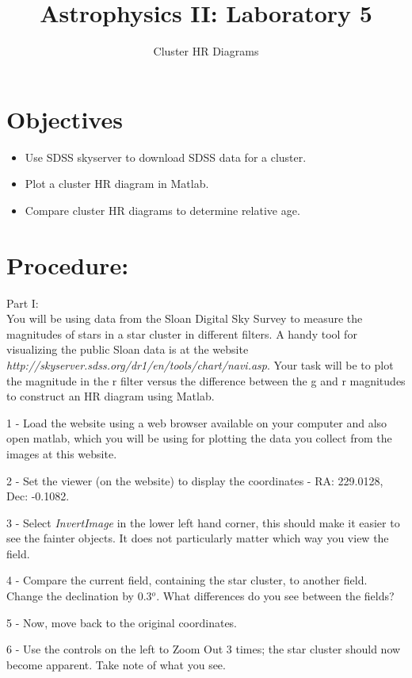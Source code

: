 \documentclass[11pt]{article}
\begin{document}
\title{Astrophysics II: Laboratory 5}
\author{\Large Cluster HR Diagrams}
\maketitle

\baselineskip 15pt

\section{\bf Objectives}
\begin{itemize}
\item Use SDSS skyserver to download SDSS data for a cluster.	
\item Plot a cluster HR diagram in Matlab.
\item Compare cluster HR diagrams to determine relative age.
\end{itemize}

\section{\bf Procedure:}

Part I:\\
You will be using data from the Sloan Digital Sky Survey to measure
the magnitudes of stars in a star cluster in different filters.  A
handy tool for visualizing the public Sloan data is at the website {\it
  http://skyserver.sdss.org/dr1/en/tools/chart/navi.asp}.  Your task
will be to plot the magnitude in the r filter versus the difference
between the g and r magnitudes to construct an HR diagram using Matlab.

1 - Load the website using a web browser available on your computer
and also open matlab, which you will be using for plotting the data you collect from the images at this website.

2 - Set the viewer (on the website) to display the coordinates - RA:
229.0128, Dec: -0.1082.

3 - Select {\it InvertImage} in the lower left hand corner, this
should make it easier to see the fainter objects. It does not particularly matter which way you view the field.

4 - Compare the current field, containing the star cluster, to another
field.  Change the declination by 0.3$^o$.  What differences do you
see between the fields?

5 - Now, move back to the original coordinates.

6 - Use the controls on the left to Zoom Out 3 times; the star cluster
should now become apparent. Take note of what you see.
\end{document}
